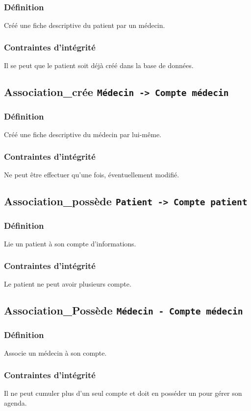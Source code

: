 \documentclass[a4paper, 11pt]{report}
\begin{document}
\subsubsection{Définition}
Créé une fiche descriptive du patient par un médecin.
\subsubsection{Contraintes d'intégrité}
Il se peut que le patient soit déjà créé dans la base de données.

\subsection{Association\_crée \texttt{Médecin -> Compte médecin}}
\subsubsection{Définition}
Créé une fiche descriptive du médecin par lui-même.
\subsubsection{Contraintes d'intégrité}
Ne peut être effectuer qu'une fois, éventuellement modifié.

\subsection{Association\_possède \texttt{Patient -> Compte patient}}
\subsubsection{Définition}
Lie un patient à son compte d'informations.
\subsubsection{Contraintes d'intégrité}
Le patient ne peut avoir plusieurs compte.

\subsection{Association\_Possède \texttt{Médecin - Compte médecin}}
\subsubsection{Définition}
Associe un médecin à son compte.
\subsubsection{Contraintes d'intégrité}
Il ne peut cumuler plus d'un seul compte et doit en posséder un pour gérer son
agenda.
\end{document}
